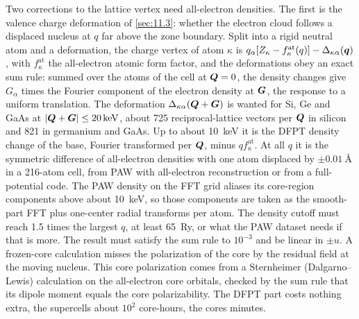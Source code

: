 Two corrections to the lattice vertex need all-electron densities. The first is the valence charge deformation of \cref{sec:11.3}: whether the electron cloud follows a displaced nucleus at $q$ far above the zone boundary. Split into a rigid neutral atom and a deformation, the charge vertex of atom $\kappa$ is $q_\alpha[Z_\kappa - f^{\mathrm{at}}_\kappa(q)] - \Delta_{\kappa\alpha}(\bm{q})$, with $f^{\mathrm{at}}_\kappa$ the all-electron atomic form factor, and the deformations obey an exact sum rule: summed over the atoms of the cell at $\bm{Q} = 0$, the density changes give $G_\alpha$ times the Fourier component of the electron density at $\bm{G}$, the response to a uniform translation. The deformation $\Delta_{\kappa\alpha}(\bm{Q}+\bm{G})$ is wanted for Si, Ge and GaAs at $|\bm{Q}+\bm{G}| \le \SI{20}{keV}$, about 725 reciprocal-lattice vectors per $\bm{Q}$ in silicon and 821 in germanium and GaAs. Up to about \SI{10}{keV} it is the DFPT density change of the base, Fourier transformed per $\bm{Q}$, minus $q f^{\mathrm{at}}_\kappa$. At all $q$ it is the symmetric difference of all-electron densities with one atom displaced by $\pm\SI{0.01}{\angstrom}$ in a 216-atom cell, from PAW with all-electron reconstruction or from a full-potential code. The PAW density on the FFT grid aliases its core-region components above about \SI{10}{keV}, so those components are taken as the smooth-part FFT plus one-center radial transforms per atom. The density cutoff must reach 1.5 times the largest $q$, at least \SI{65}{Ry}, or what the PAW dataset needs if that is more. The result must satisfy the sum rule to $10^{-3}$ and be linear in $\pm u$. A frozen-core calculation misses the polarization of the core by the residual field at the moving nucleus. This core polarization comes from a Sternheimer (Dalgarno--Lewis) calculation on the all-electron core orbitals, checked by the sum rule that its dipole moment equals the core polarizability. The DFPT part costs nothing extra, the supercells about $10^2$ core-hours, the cores minutes.

